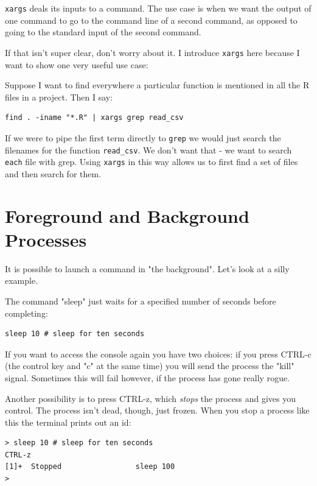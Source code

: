 \documentclass[11pt]{article}
\begin{document}
\texttt{xargs} deals its inputs to a command. The use case is when we want
the output of one command to go to the command line of a second
command, as opposed to going to the standard input of the second
command.

If that isn't super clear, don't worry about it. I introduce \texttt{xargs}
here because I want to show one very useful use case:

Suppose I want to find everywhere a particular function is mentioned
in all the R files in a project. Then I say:

\begin{verbatim}
find . -iname "*.R" | xargs grep read_csv
\end{verbatim}

If we were to pipe the first term directly to \texttt{grep} we would just
search the filenames for the function \texttt{read\_csv}. We don't want that -
we want to search \texttt{each} file with grep. Using \texttt{xargs} in this way
allows us to first find a set of files and then search for them.

\section{Foreground and Background Processes}
\label{sec:org80684ea}

It is possible to launch a command in "the background". Let's look
at a silly example.

The command "sleep" just waits for a specified number of seconds
before completing:

\begin{verbatim}
sleep 10 # sleep for ten seconds
\end{verbatim}

If you want to access the console again you have two choices: if you
press CTRL-c (the control key and "c" at the same time) you will
send the process the "kill" signal. Sometimes this will fail
however, if the process has gone really rogue.

Another possibility is to press CTRL-z, which \emph{stops} the process
and gives you control. The process isn't dead, though, just
frozen. When you stop a process like this the terminal prints out an
id:

\begin{verbatim}
> sleep 10 # sleep for ten seconds
CTRL-z
[1]+  Stopped                 sleep 100
> 
\end{verbatim}
\end{document}
